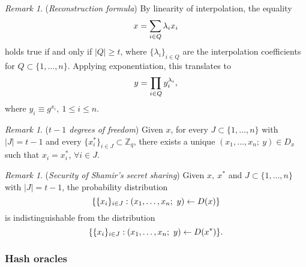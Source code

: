 \documentclass[psamsfonts, reqno]{amsart}
\theoremstyle{definition}
\theoremstyle{remark}
\newtheorem{rem}[thm]{Remark}
\numberwithin{equation}{section}
\begin{document}
\begin{rem}\label{shamir_reconstruction}
(\textit{Reconstruction formula})
By linearity of interpolation, the equality
\vspace{5pt}
\begin{equation}\label{shamir_reconstruction_secret}
x = \sum_{i \in Q} \lambda_i x_i
\vspace{5pt}
\end{equation}
holds true if and only if $|Q| \ge t$, where
$\{\lambda_i\}_{i \in Q}$ are the interpolation
coefficients for $Q \subset \{1, \dots, n\}$.
Applying exponentiation, this translates to
\vspace{5pt}
\begin{equation}\label{shamir_reconstruction_public}
y = \prod_{i \in Q} y_i^{\lambda_i},
\vspace{0pt}
\end{equation}
where $y_i \equiv g ^ {x_i},\ 1 \le i \le n$.
\end{rem}

\begin{rem}\label{shamir_degrees_of_freedom}
(\textit{$t - 1$ degrees of freedom})
Given $x$, for every
$J \subset \{1, \dots, n\}$ with $|J| = t - 1$
and every $\{x^*_i\}_{i \in J} \subset \mathbb{Z}_q$,
there exists a unique
$(x_1, \dots, x_n;\ y) \in D_x$
such that $x_i = x^*_i$, $\forall i \in J$.
\end{rem}

\begin{rem}\label{shamir_security}
(\textit{Security of Shamir's secret sharing})
Given $x,\ x^*$ and
$J \subset \{1, \dots, n\}$ with $|J| = t - 1$,
the probability distribution
\vspace{5pt}
\begin{equation*}
\{\{x_i\}_{i \in J}:
(x_1, \dots, x_n;\ y) \leftarrow D(x)\}
\vspace{5pt}
\end{equation*}
is indistinguishable from the distribution
\vspace{5pt}
\begin{equation*}
\{\{x_i\}_{i \in J}:
(x_1, \dots, x_n;\ y) \leftarrow D(x^*)\}.
\vspace{5pt}
\end{equation*}
\end{rem}

\subsubsection{Hash oracles}\label{section_hash_oracles}
\end{document}
